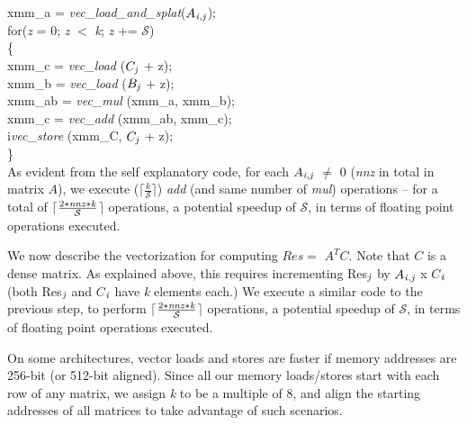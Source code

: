      \hspace*{-0.13in}xmm\_a = {\it{vec\_load\_and\_splat}}($A_{{\it{i}},{\it{j}}}$); \\
     for\hspace*{0.02in}({\it{z}} = 0; {\it{z}} $<$ {\it{k}}; {\it{z}} += $\mathcal{S}$)\\
     \{\\
         \hspace*{0.2in}xmm\_c = {\it{vec\_load}}  ($C_{{\it{j}}}$ + z); \\
         \hspace*{0.2in}xmm\_b = {\it{vec\_load}}  ($B_{{\it{j}}}$ + z); \\
         \hspace*{0.2in}xmm\_ab = {\it{vec\_mul}}  (xmm\_a, xmm\_b); \\
         \hspace*{0.2in}xmm\_c = {\it{vec\_add}}  (xmm\_ab, xmm\_c); \\
         \hspace*{0.2in}i{\it{vec\_store}} (xmm\_C,  $C_{{\it{j}}}$ + z); \\
     \}\\

     As evident from the self explanatory code, for each
     $A_{{\it{i}},{\it{j}}}$ $\neq$ 0 ({\it{nnz}} in total in matrix $A$), 
     we execute ($\lceil$$\frac{k}{\mathcal{S}}$$\rceil$) 
     {\it{add}} (and same number of {\it{mul}}) operations -- for a
     total of
     $\lceil$$\frac{2*{\it{nnz}}*{\it{k}}}{\mathcal{S}}$$\rceil$ operations,
     a potential speedup of $\mathcal{S}$,  
     in terms of floating point operations executed.

     We now describe the vectorization for computing $Res =$ $A^TC$.
     Note that $C$ is a dense matrix. As explained above, this
     requires incrementing Res$_{{\it{j}}}$ 
     by $A_{{\it{i}},{\it{j}}}$ x $C$$_{{\it{i}}}$ 
     (both Res$_{{\it{j}}}$ and $C$$_{{\it{i}}}$ have {\it{k}} elements each.)
    We execute a similar code to the previous step, to perform 
    $\lceil$$\frac{2*{\it{nnz}}*{\it{k}}}{\mathcal{S}}$$\rceil$
    operations,
    a potential speedup of $\mathcal{S}$,
    in terms of floating point operations executed.

    On some architectures, vector loads and stores are faster if
    memory addresses are 256-bit (or 512-bit aligned). 
    Since all our memory loads/stores start with each row of any
    matrix, we assign {\it{k}}  to be a multiple of 8, and align the
    starting addresses of all matrices to take advantage of such
    scenarios.
    

